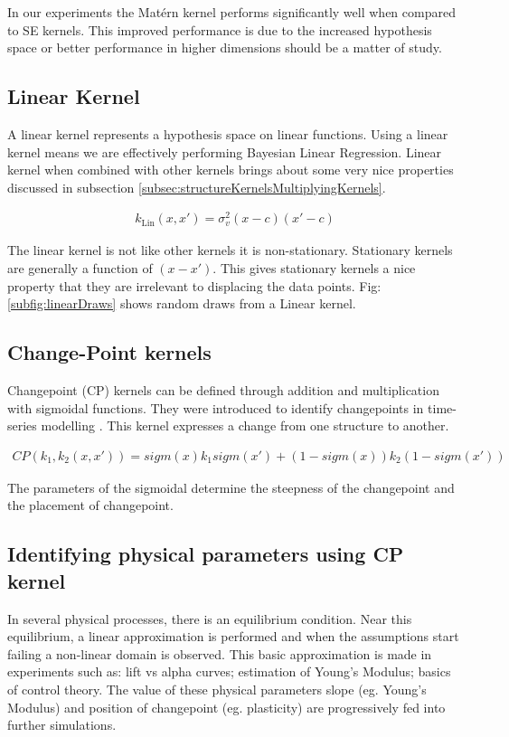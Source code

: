 In our experiments the Mat\'ern kernel performs significantly well when compared to SE kernels. This improved performance is due to the increased hypothesis space or better performance in higher dimensions should be a matter of study.

\subsection{Linear Kernel} 
A linear kernel represents a hypothesis space on linear functions. Using a linear kernel means we are effectively performing Bayesian Linear Regression. Linear kernel when combined with other kernels brings about some very nice properties discussed in subsection \ref{subsec:structureKernelsMultiplyingKernels}.

\begin{align}
k_{\textrm{Lin}}(x, x') = \sigma_v^2(x - c)(x' - c)
\end{align}

The linear kernel is not like other kernels it is non-stationary. Stationary kernels are generally a function of $(x-x')$. This gives stationary kernels a nice property that they are irrelevant to displacing the data points. Fig: \ref{subfig:linearDraws} shows random draws from a Linear kernel.

\subsection{Change-Point kernels}
Changepoint (CP) kernels can be defined through addition and multiplication with sigmoidal functions. They were introduced to identify changepoints in time-series modelling \cite{osborne2010bayesian}. This kernel expresses a change from one structure to another. 

\begin{align} \label{eq:changePointKernel}
CP(k_{1}, k_{2}(x, x')) = sigm(x)k_{1}sigm(x') + (1-sigm(x))k_{2}(1-sigm(x'))
\end{align}

The parameters of the sigmoidal determine the steepness of the changepoint and the placement of changepoint.

\subsection*{Identifying physical parameters using CP kernel}\label{subsubsec:applicationCP}
In several physical processes, there is an equilibrium condition. Near this equilibrium, a linear approximation is performed and when the assumptions start failing a non-linear domain is observed. This basic approximation is made in experiments such as: lift vs alpha curves; estimation of Young's Modulus; basics of control theory. The value of these physical parameters slope (eg. Young's Modulus) and position of changepoint (eg. plasticity) are progressively fed into further simulations. 

